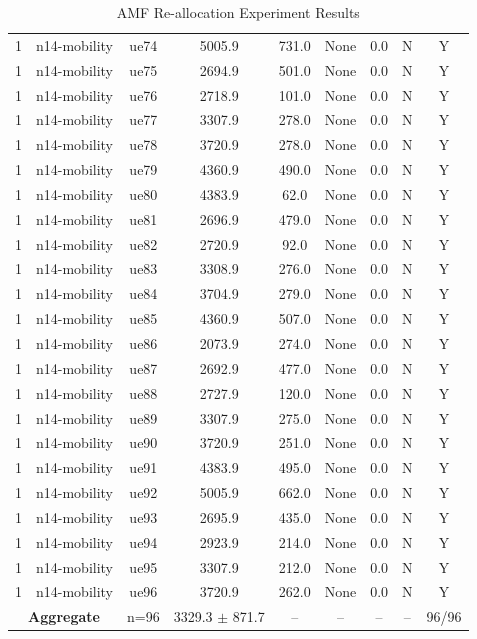 \begin{table}[ht]
\begin{tabular}{|c|c|c|c|c|c|c|c|c|}
1 & n14-mobility & ue74 & 5005.9 & 731.0 & None & 0.0 & N & Y \\
1 & n14-mobility & ue75 & 2694.9 & 501.0 & None & 0.0 & N & Y \\
1 & n14-mobility & ue76 & 2718.9 & 101.0 & None & 0.0 & N & Y \\
1 & n14-mobility & ue77 & 3307.9 & 278.0 & None & 0.0 & N & Y \\
1 & n14-mobility & ue78 & 3720.9 & 278.0 & None & 0.0 & N & Y \\
1 & n14-mobility & ue79 & 4360.9 & 490.0 & None & 0.0 & N & Y \\
1 & n14-mobility & ue80 & 4383.9 & 62.0 & None & 0.0 & N & Y \\
1 & n14-mobility & ue81 & 2696.9 & 479.0 & None & 0.0 & N & Y \\
1 & n14-mobility & ue82 & 2720.9 & 92.0 & None & 0.0 & N & Y \\
1 & n14-mobility & ue83 & 3308.9 & 276.0 & None & 0.0 & N & Y \\
1 & n14-mobility & ue84 & 3704.9 & 279.0 & None & 0.0 & N & Y \\
1 & n14-mobility & ue85 & 4360.9 & 507.0 & None & 0.0 & N & Y \\
1 & n14-mobility & ue86 & 2073.9 & 274.0 & None & 0.0 & N & Y \\
1 & n14-mobility & ue87 & 2692.9 & 477.0 & None & 0.0 & N & Y \\
1 & n14-mobility & ue88 & 2727.9 & 120.0 & None & 0.0 & N & Y \\
1 & n14-mobility & ue89 & 3307.9 & 275.0 & None & 0.0 & N & Y \\
1 & n14-mobility & ue90 & 3720.9 & 251.0 & None & 0.0 & N & Y \\
1 & n14-mobility & ue91 & 4383.9 & 495.0 & None & 0.0 & N & Y \\
1 & n14-mobility & ue92 & 5005.9 & 662.0 & None & 0.0 & N & Y \\
1 & n14-mobility & ue93 & 2695.9 & 435.0 & None & 0.0 & N & Y \\
1 & n14-mobility & ue94 & 2923.9 & 214.0 & None & 0.0 & N & Y \\
1 & n14-mobility & ue95 & 3307.9 & 212.0 & None & 0.0 & N & Y \\
1 & n14-mobility & ue96 & 3720.9 & 262.0 & None & 0.0 & N & Y \\
\multicolumn{2}{|c|}{\textbf{Aggregate}} & n=96 & 3329.3 $\pm$ 871.7 & -- & -- & -- & -- & 96/96 \\
\hline
\end{tabular}
\caption{AMF Re-allocation Experiment Results}
\label{tab:amf_realloc}
\end{table}
